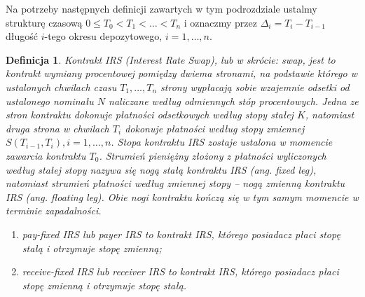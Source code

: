\documentclass{mini}
\theoremstyle{mythstyle}
\newtheorem{Definicja}{Definicja}[chapter]
\begin{document}
	Na potrzeby następnych definicji zawartych w tym podrozdziale ustalmy strukturę czasową $0\leq T_0<T_1< \ldots < T_n$ i
	oznaczmy przez $\Delta_i = T_i-T_{i-1}$ długość $i$-tego okresu depozytowego, $i=1,\ldots,n$.\\

\begin{Definicja}
	Kontrakt IRS (Interest Rate Swap), lub w skrócie: swap, jest to kontrakt wymiany procentowej pomiędzy dwiema stronami, na podstawie którego w ustalonych chwilach czasu $T_1,\ldots,T_n$ strony wypłacają sobie wzajemnie odsetki od ustalonego nominału $N$  naliczane według odmiennych stóp procentowych. Jedna ze stron kontraktu dokonuje płatności odsetkowych według stopy stałej $K$, natomiast druga strona w chwilach $T_i$ dokonuje płatności według stopy zmiennej $S(T_{i-1},T_i), i=1,\ldots,n$. Stopa kontraktu IRS zostaje ustalona w momencie zawarcia kontraktu $T_0$. Strumień pieniężny złożony z płatności wyliczonych według stałej stopy nazywa się nogą stałą kontraktu IRS (ang. fixed leg), natomiast strumień płatności według zmiennej stopy -- nogą zmienną kontraktu IRS (ang. floating leg). Obie nogi kontraktu kończą się w tym samym momencie w terminie zapadalności.
	\begin{enumerate}
		\item pay-fixed IRS lub payer IRS to kontrakt IRS, którego posiadacz płaci stopę stałą i otrzymuje stopę zmienną;
		\item receive-fixed IRS lub receiver IRS to kontrakt IRS, którego posiadacz płaci stopę zmienną i otrzymuje stopę stałą.
	\end{enumerate}
\end{Definicja}
\end{document}
